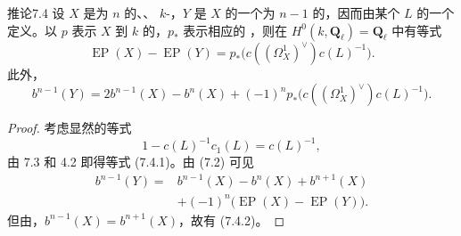 \begin{SGAresult}{推论}{7.4}
设 $X$ 是为 $n$ 的、、 $k$-，$Y$ 是 $X$ 的一个为 $n-1$ 的，因而由某个 $L$ 的一个定义。以 $p$ 表示 $X$ 到 $k$ 的，$p_*$ 表示相应的 ，则在 $H^0(k,\mathbf Q_\ell)=\mathbf Q_\ell$ 中有等式
\[
 \operatorname{EP}(X)-\operatorname{EP}(Y)
 =p_*\bigl(c((\Omega_X^1)^\vee)c(L)^{-1}\bigr).\tag{7.4.1}
\]
此外，
\[
 b^{n-1}(Y)=2b^{n-1}(X)-b^n(X)
 +(-1)^np_*\bigl(c((\Omega_X^1)^\vee)c(L)^{-1}\bigr).\tag{7.4.2}
\]
\end{SGAresult}
\begin{proof}
考虑显然的等式
\[
 1-c(L)^{-1}c_1(L)=c(L)^{-1},
\]
由 7.3 和 4.2 即得等式 (7.4.1)。由 (7.2) 可见
\[
 \begin{split}
 b^{n-1}(Y)={}&b^{n-1}(X)-b^n(X)+b^{n+1}(X)\\
 &+(-1)^n\bigl(\operatorname{EP}(X)-\operatorname{EP}(Y)\bigr).
 \end{split}
\]
但由，$b^{n-1}(X)=b^{n+1}(X)$，故有 (7.4.2)。
\end{proof}

